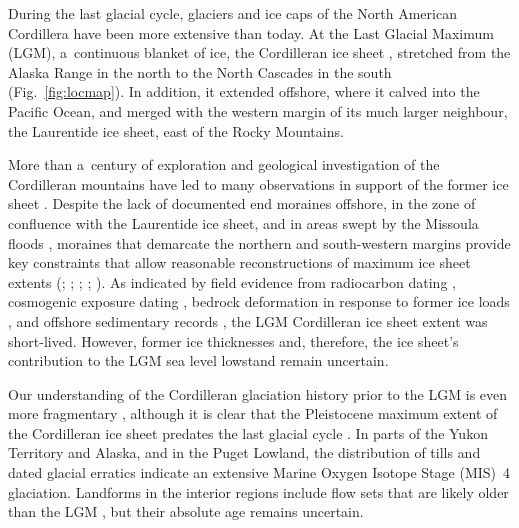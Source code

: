 \documentclass[tc, manuscript]{copernicus}
\begin{document}
\introduction
\label{sec:intro}

      During the last glacial cycle, glaciers and ice caps of the North
      American Cordillera have been more extensive than today. At the Last
      Glacial Maximum (LGM), a~continuous blanket of ice, the Cordilleran
      ice sheet \citep{Dawson.1888}, stretched from the Alaska Range in the
      north to the North Cascades in the south (Fig.~\ref{fig:locmap}). In
      addition, it extended offshore, where it calved into the Pacific
      Ocean, and merged with the western margin of its much larger
      neighbour, the Laurentide ice sheet, east of the Rocky Mountains.

      More than a~century of exploration and geological investigation of the
      Cordilleran mountains have led to many observations in support of the
      former ice sheet \citep{Jackson.Clague.1991}. Despite the lack of
      documented end moraines offshore, in the zone of confluence with the
      Laurentide ice sheet, and in areas swept by the Missoula floods
      \citep{Carrara.etal.1996}, moraines that demarcate the northern and
      south-western margins provide key constraints that allow reasonable
      reconstructions of maximum ice sheet extents
      (\citealp{Prest.etal.1968}; \citealp[Fig.~1.12]{Clague.1989};
      \citealp{Duk-Rodkin.1999}; \citealp{Booth.etal.2003};
      \citealp{Dyke.2004}). As indicated by field evidence from radiocarbon
      dating \citep{Clague.etal.1980, Clague.1985, Clague.1986,
      Porter.Swanson.1998, Menounos.etal.2008}, cosmogenic exposure dating
      \citep{Stroeven.etal.2010, Stroeven.etal.2014, Margold.etal.2014},
      bedrock deformation in response to former ice loads
      \citep{Clague.James.2002, Clague.etal.2005}, and offshore sedimentary
      records \citep{Cosma.etal.2008, Davies.etal.2011}, the LGM Cordilleran
      ice sheet extent was short-lived. However, former ice thicknesses and,
      therefore, the ice sheet's contribution to the LGM sea level lowstand
      \citep{Carlson.Clark.2012, Clark.Mix.2002} remain uncertain.

      Our understanding of the Cordilleran glaciation history prior to the
      LGM is even more fragmentary \citep{Barendregt.Irving.1998,
      Kleman.etal.2010, Rutter.etal.2012}, although it is clear that the
      Pleistocene maximum extent of the Cordilleran ice sheet predates the
      last glacial cycle \citep{Hidy.etal.2013}. In parts of the Yukon
      Territory and Alaska, and in the Puget Lowland, the distribution of
      tills \citep{Turner.etal.2013, Troost.2014} and dated glacial erratics
      \citep{Ward.etal.2007, Ward.etal.2008, Briner.Kaufman.2008,
      Stroeven.etal.2010, Stroeven.etal.2014} indicate an extensive Marine
      Oxygen Isotope Stage (MIS)~4 glaciation. Landforms in the interior
      regions include flow sets that are likely older than the LGM
      \citep[Fig.~2]{Kleman.etal.2010}, but their absolute age remains
      uncertain.
\end{document}
